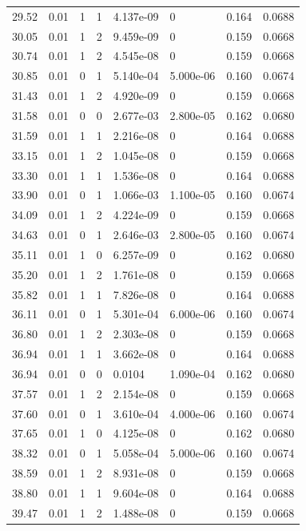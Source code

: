 \documentclass[preview]{standalone}
\begin{document}
{{{\begin{tabular}{L{1.2cm}C{1.2cm} C{0.3cm}C{0.5cm} C{1.4cm}C{1.4cm} C{1.4cm}C{1.4cm}}
  29.52  &  0.01  & 1     &  1 &  4.137e-09  & 0  & 0.164 &  0.0688   \\ 
  30.05  &  0.01  & 1     &  2 &  9.459e-09  & 0  & 0.159 &  0.0668   \\ 
  30.74  &  0.01  & 1     &  2 &  4.545e-08  & 0  & 0.159 &  0.0668   \\ 
  30.85  &  0.01  & 0     &  1 &  5.140e-04  & 5.000e-06  & 0.160 &  0.0674   \\ 
  31.43  &  0.01  & 1     &  2 &  4.920e-09  & 0  & 0.159 &  0.0668   \\ 
  31.58  &  0.01  & 0     &  0 &  2.677e-03  & 2.800e-05  & 0.162 &  0.0680   \\ 
  31.59  &  0.01  & 1     &  1 &  2.216e-08  & 0  & 0.164 &  0.0688   \\ 
  33.15  &  0.01  & 1     &  2 &  1.045e-08  & 0  & 0.159 &  0.0668   \\ 
  33.30  &  0.01  & 1     &  1 &  1.536e-08  & 0  & 0.164 &  0.0688   \\ 
  33.90  &  0.01  & 0     &  1 &  1.066e-03  & 1.100e-05  & 0.160 &  0.0674   \\ 
  34.09  &  0.01  & 1     &  2 &  4.224e-09  & 0  & 0.159 &  0.0668   \\ 
  34.63  &  0.01  & 0     &  1 &  2.646e-03  & 2.800e-05  & 0.160 &  0.0674   \\ 
  35.11  &  0.01  & 1     &  0 &  6.257e-09  & 0  & 0.162 &  0.0680   \\ 
  35.20  &  0.01  & 1     &  2 &  1.761e-08  & 0  & 0.159 &  0.0668   \\ 
  35.82  &  0.01  & 1     &  1 &  7.826e-08  & 0  & 0.164 &  0.0688   \\ 
  36.11  &  0.01  & 0     &  1 &  5.301e-04  & 6.000e-06  & 0.160 &  0.0674   \\ 
  36.80  &  0.01  & 1     &  2 &  2.303e-08  & 0  & 0.159 &  0.0668   \\ 
  36.94  &  0.01  & 1     &  1 &  3.662e-08  & 0  & 0.164 &  0.0688   \\ 
  36.94  &  0.01  & 0     &  0 &  0.0104  & 1.090e-04  & 0.162 &  0.0680   \\ 
  37.57  &  0.01  & 1     &  2 &  2.154e-08  & 0  & 0.159 &  0.0668   \\ 
  37.60  &  0.01  & 0     &  1 &  3.610e-04  & 4.000e-06  & 0.160 &  0.0674   \\ 
  37.65  &  0.01  & 1     &  0 &  4.125e-08  & 0  & 0.162 &  0.0680   \\ 
  38.32  &  0.01  & 0     &  1 &  5.058e-04  & 5.000e-06  & 0.160 &  0.0674   \\ 
  38.59  &  0.01  & 1     &  2 &  8.931e-08  & 0  & 0.159 &  0.0668   \\ 
  38.80  &  0.01  & 1     &  1 &  9.604e-08  & 0  & 0.164 &  0.0688   \\ 
  39.47  &  0.01  & 1     &  2 &  1.488e-08  & 0  & 0.159 &  0.0668   \\ 
\hline 
\end{tabular} 

}}}
\end{document}
